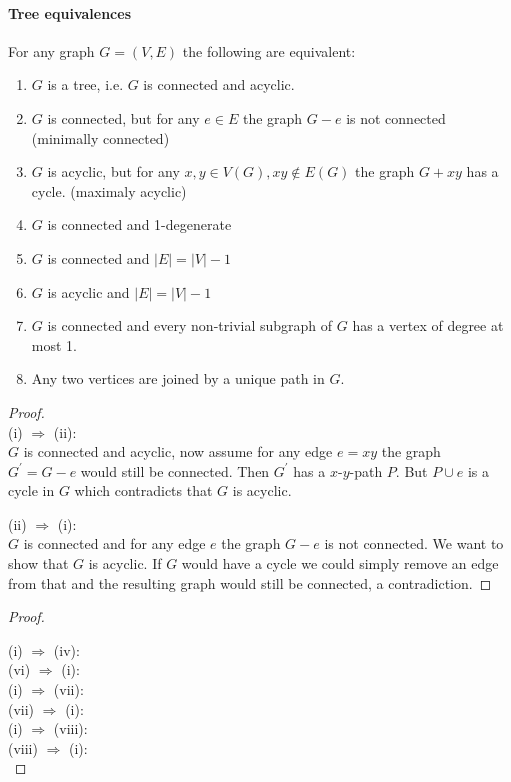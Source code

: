 \paragraph{Tree equivalences} For any graph $ G = (V,E) $ the following are equivalent:
\begin{enumerate}
    \item $G $ is a tree, i.e. $ G $ is connected and acyclic.
    \item $G $ is connected, but for any $ e \in E $ the graph $ G - e $ is not 
    connected (minimally connected)
    \item $G $ is acyclic, but for any $ x,y \in V(G), xy \notin E(G) $ the graph 
    $ G + xy $ has a cycle. (maximaly acyclic) 
    \item $G $ is connected and 1-degenerate
    \item $G $ is connected and $ |E| = |V| - 1 $
    \item $G $ is acyclic and $ |E| = |V| - 1 $
    \item $G $ is connected and every non-trivial subgraph of $ G $ has a vertex of 
    degree at most 1.
    \item Any two vertices are joined by a unique path in $ G $.
\end{enumerate}
\begin{proof} $ $ \\
    (i) $ \Rightarrow $ (ii): \\
    $ G $ is connected and acyclic, now assume for any edge $ e = xy $ the graph
    $ G^\prime = G - e $ would still be connected. Then $ G^\prime $ has a 
    $x$-$y$-path $ P $. But $ P \cup {e} $ is a cycle in $ G $ which contradicts
    that $ G $ is acyclic.

    \smallskip
    \noindent(ii) $ \Rightarrow $ (i): \\
    $ G $ is connected and for any edge $ e $ the graph $ G - e $ is not connected.
    We want to show that $ G $ is acyclic. If $ G $ would have a cycle we could simply
    remove an edge from that and the resulting graph would still be connected, 
    a contradiction.
\end{proof}
\begin{proof} $ $ \\
    {\color{red}{TODO complete all equivalences for exam}}

    \noindent
    (i) $ \Rightarrow $ (iv): \\


    \smallskip \noindent
    (vi) $ \Rightarrow $ (i): \\

    \smallskip \noindent
    (i) $ \Rightarrow $ (vii): \\

    \smallskip \noindent
    (vii) $ \Rightarrow $ (i): \\

    \smallskip \noindent
    (i) $ \Rightarrow $ (viii): \\

    \smallskip \noindent
    \noindent(viii) $ \Rightarrow $ (i): \\
\end{proof}


